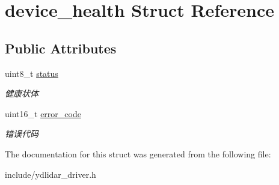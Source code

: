 \hypertarget{structdevice__health}{}\section{device\+\_\+health Struct Reference}
\label{structdevice__health}
\subsection*{Public Attributes}
\begin{DoxyCompactItemize}
\item 
uint8\+\_\+t \hyperlink{structdevice__health_ac3425f5555ecbb5a0da03b4cabe2777c}{status}\hypertarget{structdevice__health_ac3425f5555ecbb5a0da03b4cabe2777c}{}\label{structdevice__health_ac3425f5555ecbb5a0da03b4cabe2777c}

\begin{DoxyCompactList}\small\item\em 健康状体 \end{DoxyCompactList}\item 
uint16\+\_\+t \hyperlink{structdevice__health_a8815828d6de33cb43e8b72da48f51f23}{error\+\_\+code}\hypertarget{structdevice__health_a8815828d6de33cb43e8b72da48f51f23}{}\label{structdevice__health_a8815828d6de33cb43e8b72da48f51f23}

\begin{DoxyCompactList}\small\item\em 错误代码 \end{DoxyCompactList}\end{DoxyCompactItemize}


The documentation for this struct was generated from the following file\+:\begin{DoxyCompactItemize}
\item 
include/ydlidar\+\_\+driver.\+h\end{DoxyCompactItemize}
